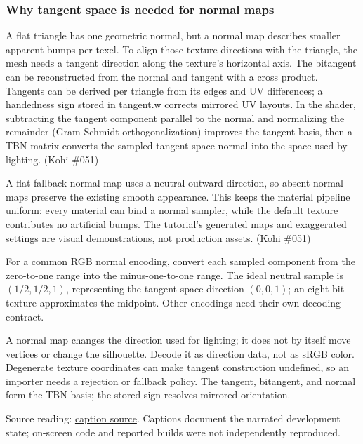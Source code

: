 \subsubsection{Why tangent space is needed for normal maps}\label{06-engine-ii-ch025-why-tangent-space-is-needed-for-normal-maps}

\hypertarget{06-engine-ii-ch025-why-tangent-space-is-needed-for-normal-maps}{}

A flat triangle has one geometric normal, but a normal map describes smaller apparent bumps per texel. To align those texture directions with the triangle, the mesh needs a tangent direction along the texture's horizontal axis. The bitangent can be reconstructed from the normal and tangent with a cross product. Tangents can be derived per triangle from its edges and UV differences; a handedness sign stored in tangent.w corrects mirrored UV layouts. In the shader, subtracting the tangent component parallel to the normal and normalizing the remainder (Gram-Schmidt orthogonalization) improves the tangent basis, then a TBN matrix converts the sampled tangent-space normal into the space used by lighting. (Kohi \#051)

A flat fallback normal map uses a neutral outward direction, so absent normal maps preserve the existing smooth appearance. This keeps the material pipeline uniform: every material can bind a normal sampler, while the default texture contributes no artificial bumps. The tutorial's generated maps and exaggerated settings are visual demonstrations, not production assets. (Kohi \#051)

For a common RGB normal encoding, convert each sampled component from the zero-to-one range into the minus-one-to-one range. The ideal neutral sample is \((1/2,1/2,1)\), representing the tangent-space direction \((0,0,1)\); an eight-bit texture approximates the midpoint. Other encodings need their own decoding contract.

A normal map changes the direction used for lighting; it does not by itself move vertices or change the silhouette. Decode it as direction data, not as sRGB color. Degenerate texture coordinates can make tangent construction undefined, so an importer needs a rejection or fallback policy. The tangent, bitangent, and normal form the TBN basis; the stored sign resolves mirrored orientation.

Source reading: \href{https://www.youtube.com/watch?v=I0259XQnKng}{caption source}. Captions document the narrated development state; on-screen code and reported builds were not independently reproduced.

